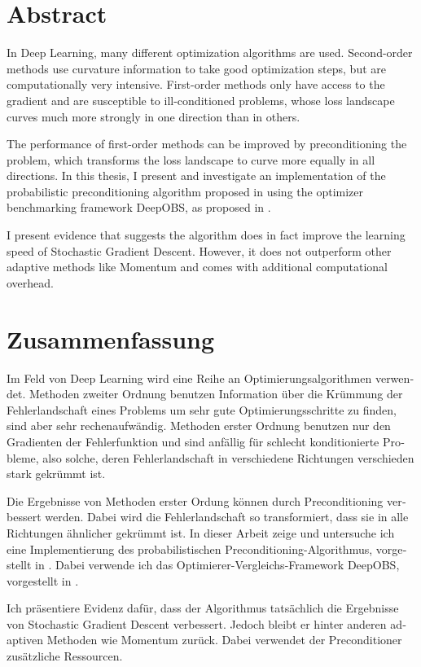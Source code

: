 \documentclass[twoside,12pt,a4paper]{report}
\begin{document}

\setcounter{page}{1}



\section*{Abstract}
In Deep Learning, many different optimization algorithms are used. Second-order methods use curvature information to take good optimization steps, but are computationally very intensive. First-order methods only have access to the gradient and are susceptible to ill-conditioned problems, whose loss landscape curves much more strongly in one direction than in others.

The performance of first-order methods can be improved by preconditioning the problem, which transforms the loss landscape to curve more equally in all directions. In this thesis, I present and investigate an implementation of the probabilistic preconditioning algorithm proposed in \cite{roos2019active} using the optimizer benchmarking framework DeepOBS, as proposed in \cite{deepobs}.

I present evidence that suggests the algorithm does in fact improve the learning speed of Stochastic Gradient Descent. However, it does not outperform other adaptive methods like Momentum and comes with additional computational overhead.

\newpage
\section*{Zusammenfassung}
\begin{otherlanguage}{ngerman}
Im Feld von Deep Learning wird eine Reihe an Optimierungsalgorithmen verwendet. Methoden zweiter Ordnung benutzen Information über die Krümmung der Fehlerlandschaft eines Problems um sehr gute Optimierungsschritte zu finden, sind aber sehr rechenaufwändig. Methoden erster Ordnung benutzen nur den Gradienten der Fehlerfunktion und sind anfällig für schlecht konditionierte Probleme, also solche, deren Fehlerlandschaft in verschiedene Richtungen verschieden stark gekrümmt ist.

Die Ergebnisse von Methoden erster Ordung können durch Preconditioning verbessert werden. Dabei wird die Fehlerlandschaft so transformiert, dass sie in alle Richtungen ähnlicher gekrümmt ist.
In dieser Arbeit zeige und untersuche ich eine Implementierung des probabilistischen Preconditioning-Algorithmus, vorgestellt in \cite{roos2019active}. Dabei verwende ich das Optimierer-Vergleichs-Framework DeepOBS, vorgestellt in \cite{deepobs}.

Ich präsentiere Evidenz dafür, dass der Algorithmus tatsächlich die Ergebnisse von Stochastic Gradient Descent verbessert. Jedoch bleibt er hinter anderen adaptiven Methoden wie Momentum zurück. Dabei verwendet der Preconditioner zusätzliche Ressourcen.
\end{otherlanguage}
\end{document}
